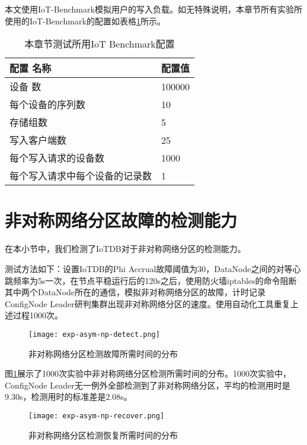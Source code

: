 本文使用IoT-Benchmark\cite{iot-benchmark}模拟用户的写入负载。如无特殊说明，本章节所有实验所使用的IoT-Benchmark的配置如表格\ref{tab:iot-benchmark-default}所示。

\begin{table}[h!]
    \centering
    \caption{本章节测试所用IoT Benchmark配置}
    \label{tab:iot-benchmark-default}
    \begin{tabular}{ll}
        \toprule
        配置 名称 & 配置值 \\
        \midrule
        设备 数 & 100000  \\
        每个设备的序列数 & 10   \\
        存储组数 & 5  \\
        写入客户端数 & 25  \\
        每个写入请求的设备数 & 1000  \\
        每个写入请求中每个设备的记录数 & 1 \\
        \bottomrule
    \end{tabular}
\end{table}


\section{非对称网络分区故障的检测能力}

在本小节中，我们检测了IoTDB对于非对称网络分区的检测能力。

测试方法如下：设置IoTDB的Phi Accrual故障阈值为30，DataNode之间的对等心跳频率为5s一次，在节点平稳运行后的120s之后，使用防火墙iptables的命令阻断其中两个DataNode所在的通信，模拟非对称网络分区的故障，计时记录ConfigNode Leader研判集群出现非对称网络分区的速度。使用自动化工具重复上述过程1000次。

\begin{figure}
    \centering
    \texttt{[image: exp-asym-np-detect.png]}
    \caption{非对称网络分区检测故障所需时间的分布}
    \label{fig:exp-asym-np-detect}
\end{figure}

图\ref{fig:exp-asym-np-detect}展示了1000次实验中非对称网络分区检测所需时间的分布。1000次实验中，ConfigNode Leader无一例外全部检测到了非对称网络分区，平均的检测用时是9.30s，检测用时的标准差是2.08s。

\begin{figure}
    \centering
    \texttt{[image: exp-asym-np-recover.png]}
    \caption{非对称网络分区检测恢复所需时间的分布}
    \label{fig:exp-asym-np-recover}
\end{figure}

